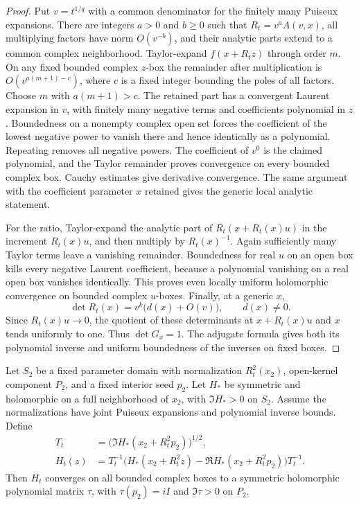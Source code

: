 \begin{proof}
Put $v=t^{1/q}$ with a common denominator for the finitely many Puiseux expansions.  There are integers $a>0$ and $b\ge0$ such that $R_t=v^a A(v,x)$, all multiplying factors have norm $O(v^{-b})$, and their analytic parts extend to a common complex neighborhood. Taylor-expand $f(x+R_tz)$ through order $m$.  On any fixed bounded complex $z$-box the remainder after multiplication is $O(v^{a(m+1)-c})$, where $c$ is a fixed integer bounding the poles of all factors.  Choose $m$ with $a(m+1)>c$.  The retained part has a convergent Laurent expansion in $v$, with finitely many negative terms and coefficients polynomial in $z$.  Boundedness on a nonempty complex open set forces the coefficient of the lowest negative power to vanish there and hence identically as a polynomial.  Repeating removes all negative powers.  The coefficient of $v^0$ is the claimed polynomial, and the Taylor remainder proves convergence on every bounded complex box.  Cauchy estimates give derivative convergence. The same argument with the coefficient parameter $x$ retained gives the generic local analytic statement.

For the ratio, Taylor-expand the analytic part of $R_t(x+R_t(x)u)$ in the increment $R_t(x)u$, and then multiply by $R_t(x)^{-1}$.  Again sufficiently many Taylor terms leave a vanishing remainder.  Boundedness for real $u$ on an open box kills every negative Laurent coefficient, because a polynomial vanishing on a real open box vanishes identically.  This proves even locally uniform holomorphic convergence on bounded complex $u$-boxes. Finally, at a generic $x$,
\[
                  \det R_t(x)=v^k\bigl(d(x)+O(v)\bigr),
                         \qquad d(x)\ne0.
\]
Since $R_t(x)u\to0$, the quotient of these determinants at $x+R_t(x)u$ and $x$ tends uniformly to one.  Thus $\det G_x=1$. The adjugate formula gives both its polynomial inverse and uniform boundedness of the inverses on fixed boxes.
\end{proof}

\begin{lemma}\label{lem:win-siegel-normalization}
Let $S_2$ be a fixed parameter domain with normalization $R_t^2(x_2)$, open-kernel component $P_2$, and a fixed interior seed $p_2$. Let $H_*$ be symmetric and holomorphic on a full neighborhood of $x_2$, with $\Im H_*>0$ on $S_2$.  Assume the normalizations have joint Puiseux expansions and polynomial inverse bounds.  Define
\begin{align}
 T_t&=\bigl(\Im H_*(x_2+R_t^2p_2)\bigr)^{1/2},\label{eq:win-T}\\
 H_t(z)&=T_t^{-1}\bigl(H_*(x_2+R_t^2z)
             -\Re H_*(x_2+R_t^2p_2)\bigr)T_t^{-1}.\label{eq:win-Ht}
\end{align}
Then $H_t$ converges on all bounded complex boxes to a symmetric holomorphic polynomial matrix $\tau$, with $\tau(p_2)=iI$ and $\Im\tau>0$ on $P_2$.
\end{lemma}

